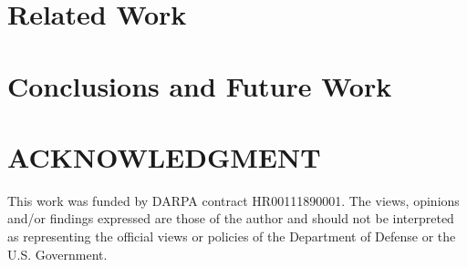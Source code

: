 \documentclass[runningheads]{llncs}
\begin{document}
\section{Related Work}
\label{rw}


\section{Conclusions and Future Work}
\label{conclusion}


\section{ACKNOWLEDGMENT}

This work was funded by DARPA contract HR00111890001. The
views, opinions and/or findings expressed are those of the author
and should not be interpreted as representing the official views or
policies of the Department of Defense or the U.S. Government.

%
%
%


%
\end{document}
